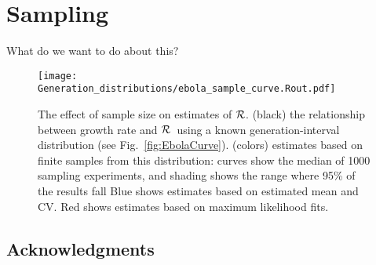 \documentclass[12pt,]{article}
\newcommand{\RR}{\ensuremath{{\cal R}}}
\newcommand{\fref}[1]{Fig.~\ref{fig:#1}}
\begin{document}
\section{Sampling}

What do we want to do about this?

\begin{figure}[htbp] \centering
	\texttt{[image: Generation\_distributions/ebola\_sample\_curve.Rout.pdf]}
\caption{
%
The effect of sample size on estimates of \RR.
(black) the relationship between growth rate and \RR~using a known generation-interval distribution (see \fref{EbolaCurve}).
(colors) estimates based on finite samples from this distribution: curves show the median of 1000 sampling experiments, and shading shows the range where 95\% of the results fall
Blue shows estimates based on estimated mean and CV.
Red shows estimates based on maximum likelihood fits.
%
}
	\label{fig:ebolaSample}
\end{figure}

\subsection*{Acknowledgments}

\printbibliography
\end{document}
